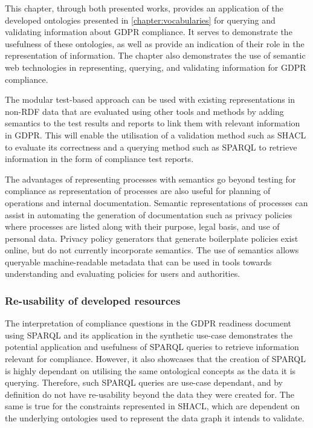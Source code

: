 This chapter, through both presented works, provides an application of the developed ontologies presented in \autoref{chapter:vocabularies} for querying and validating information about GDPR compliance.
It serves to demonstrate the usefulness of these ontologies, as well as provide an indication of their role in the representation of information.
The chapter also demonstrates the use of semantic web technologies in representing, querying, and validating information for GDPR compliance.

The modular test-based approach can be used with existing representations in non-RDF data that are evaluated using other tools and methods by adding semantics to the test results and reports to link them with relevant information in GDPR. This will enable the utilisation of a validation method such as SHACL to evaluate its correctness and a querying method such as SPARQL to retrieve information in the form of compliance test reports. 

The advantages of representing processes with semantics go beyond testing for compliance as representation of processes are also useful for planning of operations and internal documentation. Semantic representations of processes can assist in automating the generation of documentation such as privacy policies where processes are listed along with their purpose, legal basis, and use of personal data. Privacy policy generators that generate boilerplate policies exist online, but do not currently incorporate semantics. The use of semantics allows queryable machine-readable metadata that can be used in tools towards understanding and evaluating policies for users and authorities.

\subsubsection*{Re-usability of developed resources}
The interpretation of compliance questions in the GDPR readiness document using SPARQL and its application in the synthetic use-case demonstrates the potential application and usefulness of SPARQL queries to retrieve information relevant for compliance.
However, it also showcases that the creation of SPARQL is highly dependant on utilising the same ontological concepts as the data it is querying. Therefore, such SPARQL queries are use-case dependant, and by definition do not have re-usability beyond the data they were created for.
The same is true for the constraints represented in SHACL, which are dependent on the underlying ontologies used to represent the data graph it intends to validate.

